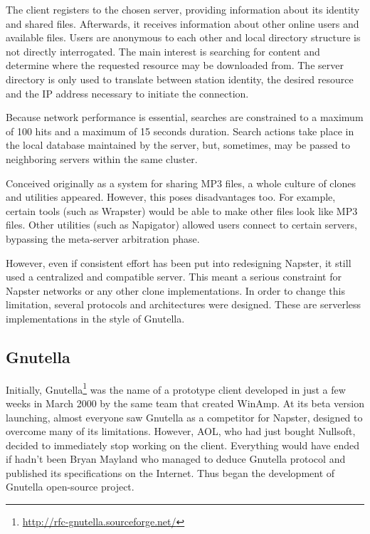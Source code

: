 The client registers to the chosen server, providing information about its
identity and shared files. Afterwards, it receives information about other
online users and available files. Users are anonymous to each other and local
directory structure is not directly interrogated. The main interest is
searching for content and determine where the requested resource may be
downloaded from.  The server directory is only used to translate between
station identity, the desired resource and the IP address necessary to
initiate the connection.

Because network performance is essential, searches are constrained to a maximum
of 100 hits and a maximum of 15 seconds duration. Search actions take place
in the local database maintained by the server, but, sometimes, may be passed
to neighboring servers within the same cluster.

Conceived originally as a system for sharing MP3 files, a whole culture of
clones and utilities appeared. However, this poses disadvantages too. For
example, certain tools (such as Wrapster) would be able to make other files
look like MP3 files. Other utilities (such as Napigator) allowed users
connect to certain servers, bypassing the meta-server arbitration phase.

However, even if consistent effort has been put into redesigning Napster, it
still used a centralized and compatible server. This meant a serious
constraint for Napster networks or any other clone implementations. In order
to change this limitation, several protocols and architectures were designed.
These are serverless implementations in the style of Gnutella.

\subsection{Gnutella}

Initially, Gnutella\footnote{\url{http://rfc-gnutella.sourceforge.net/}} was the name of a prototype client developed in just a few
weeks in March 2000 by the same team that created WinAmp. At its beta version
launching, almost everyone saw Gnutella as a competitor for Napster, designed
to overcome many of its limitations. However, AOL, who had just bought
Nullsoft, decided to immediately stop working on the client. Everything would
have ended if hadn't been Bryan Mayland who managed to deduce Gnutella
protocol and published its specifications on the Internet. Thus began the
development of Gnutella open-source project.

